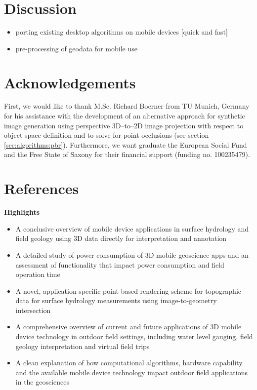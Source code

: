 \documentclass[review]{elsarticle}
\begin{document}
\section{Discussion}
\label{sec:discussion}

\begin{itemize}
\item porting existing desktop algorithms on mobile devices [quick and fast]
\item pre-processing of geodata for mobile use
\end{itemize}

\section*{Acknowledgements}
First, we would like to thank M.Sc. Richard Boerner from TU Munich, Germany for his assistance with the development of an alternative approach for synthetic image generation using perspective 3D--to--2D image projection with respect to object space definition and to solve for point occlusions (see section \ref{sec:algorithms:pbr}). Furthermore, we want graduate the European Social Fund and the Free State of Saxony for their financial support (funding no. 100235479).

\section*{References}



\newpage
\textbf{Highlights} \\
\begin{itemize}
\item A conclusive overview of mobile device applications in surface hydrology and field geology using 3D data directly for interpretation and annotation
\item A detailed study of power consumption of 3D mobile geoscience apps and an assessment of functionality that impact power consumption and field operation time
\item A novel, application-specific point-based rendering scheme for topographic data for surface hydrology measurements using image-to-geometry intersection
\item A comprehensive overview of current and future applications of 3D mobile device technology in outdoor field settings, including water level gauging, field geology interpretation and virtual field trips
\item A clean explanation of how computational algorithms, hardware capability and the available mobile device technology impact outdoor field applications in the geosciences
\end{itemize}
\end{document}
